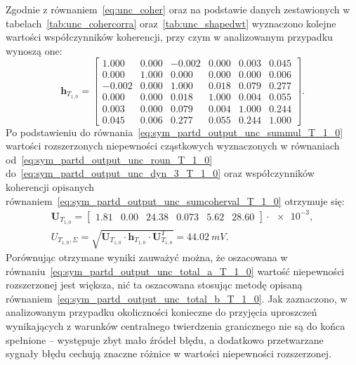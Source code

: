 Zgodnie z równaniem~\eqref{eq:unc_coher} oraz na podstawie danych zestawionych w tabelach~\ref{tab:unc_cohercorra} oraz~\ref{tab:unc_shapedwt} wyznaczono kolejne wartości współczynników koherencji, przy czym w analizowanym przypadku wynoszą one:
\begin{equation}
\mathbf{h}_{T_{1,0}} =
\begin{bmatrix}
1.000  & 0.000 & -0.002 & 0.000 & 0.003 & 0.045 \\
0.000  & 1.000 & 0.000  & 0.000 & 0.000 & 0.006 \\
-0.002 & 0.000 & 1.000  & 0.018 & 0.079 & 0.277 \\
0.000  & 0.000 & 0.018  & 1.000 & 0.004 & 0.055 \\
0.003  & 0.000 & 0.079  & 0.004 & 1.000 & 0.244 \\
0.045  & 0.006 & 0.277  & 0.055 & 0.244 & 1.000
\end{bmatrix}
\label{eq:sym_partd_output_unc_sumcoherval_T_1_0}.
\end{equation}
Po podstawieniu do równania~\eqref{eq:sym_partd_output_unc_summul_T_1_0} wartości rozszerzonych niepewności cząstkowych wyznaczonych w równaniach od~\eqref{eq:sym_partd_output_unc_roun_T_1_0} do~\eqref{eq:sym_partd_output_unc_dyn_3_T_1_0} oraz współczynników koherencji opisanych równaniem~\eqref{eq:sym_partd_output_unc_sumcoherval_T_1_0} otrzymuje się:
\begin{gather}
\mathbf{U}_{T_{1,0}} =
\begin{bmatrix}
\num{1.81} & \num{0.00} & \num{24.38} & \num{0.073} & \num{5.62} & \num{28.60}
\end{bmatrix} \cdot \num{e-3}
\label{eq:sym_partd_output_unc_sumuvectval_T_1_0}, \\
U_{T_{1,0},\Sigma} = \sqrt{\mathbf{U}_{T_{1,0}} \cdot \mathbf{h}_{T_{1,0}} \cdot \mathbf{U}_{T_{1,0}}^{T}} = \qty{44.02}{mV} \label{eq:sym_partd_output_unc_total_b_T_1_0}.
\end{gather}
Porównując otrzymane wyniki zauważyć można, że oszacowana w równaniu~\eqref{eq:sym_partd_output_unc_total_a_T_1_0} wartość niepewności rozszerzonej jest większa, nić ta oszacowana stosując metodę opisaną równaniem~\eqref{eq:sym_partd_output_unc_total_b_T_1_0}. Jak zaznaczono, w analizowanym przypadku okoliczności konieczne do przyjęcia uproszczeń wynikających z warunków centralnego twierdzenia granicznego nie są do końca spełnione -- występuje zbyt mało źródeł błędu, a dodatkowo przetwarzane sygnały błędu cechują znaczne różnice w wartości niepewności rozszerzonej.

